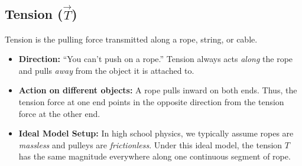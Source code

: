 \documentclass{article}
\begin{document}
\subsection{Tension ($\vec{T}$)}
Tension is the pulling force transmitted along a rope, string, or cable. 
\begin{itemize}
    \item \textbf{Direction:} ``You can't push on a rope.'' Tension always acts \emph{along} the rope and pulls \emph{away} from the object it is attached to.
    \item \textbf{Action on different objects:} A rope pulls inward on both ends. Thus, the tension force at one end points in the opposite direction from the tension force at the other end.
    \item \textbf{Ideal Model Setup:} In high school physics, we typically assume ropes are \emph{massless} and pulleys are \emph{frictionless}. Under this ideal model, the tension $T$ has the same magnitude everywhere along one continuous segment of rope.
\end{itemize}
\end{document}
